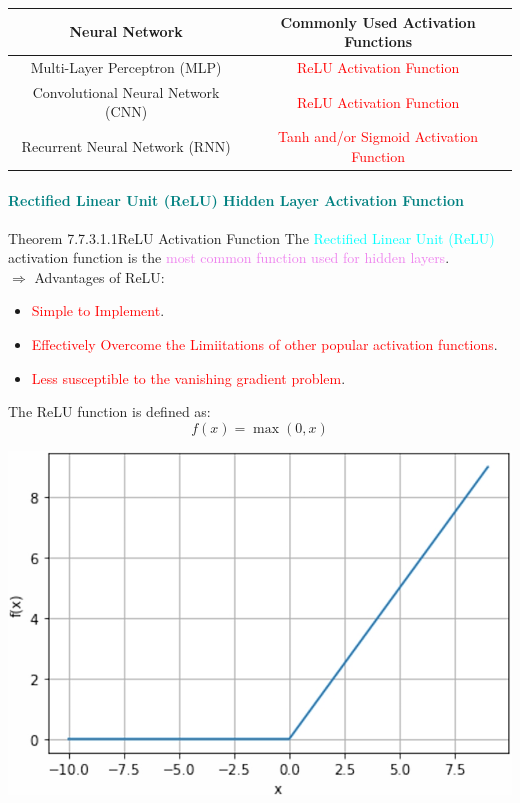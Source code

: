 \documentclass{book}
\begin{document}
\begin{center}
    \begin{tabular}{|c|c|}
        \hline
        \rowcolor{lightblue}
        \textbf{Neural Network} & \textbf{Commonly Used Activation Functions} \\
        \hline
        Multi-Layer Perceptron (MLP) & \textcolor{red}{ReLU Activation Function} \\
        \hline
        Convolutional Neural Network (CNN) & \textcolor{red}{ReLU Activation Function} \\
        \hline
        Recurrent Neural Network (RNN) & \textcolor{red}{Tanh and/or Sigmoid Activation Function} \\
        \hline
    \end{tabular}
\end{center}
\newpage
\textcolor{teal}{\paragraph{Rectified Linear Unit (ReLU) Hidden Layer Activation Function}}
\begin{thmBox}{Theorem 7.7.3.1.1}{ReLU Activation Function}
    The \textcolor{cyan}{Rectified Linear Unit (ReLU)} activation function is the \textcolor{violet}{most common function used for hidden layers}.\\
    $\Rightarrow$ Advantages of ReLU:
    \begin{itemize}
        \item \textcolor{red}{Simple to Implement}.
        \item \textcolor{red}{Effectively Overcome the Limiitations of other popular activation functions}.
        \item \textcolor{red}{Less susceptible to the vanishing gradient problem}.
    \end{itemize}
    The ReLU function is defined as:
    \[
        f(x) = \max(0, x)
    \]
    \begin{center}
        \includegraphics[scale=0.2]{chapter 7/ch7_figure32.jpeg}
    \end{center}
\end{thmBox}
\end{document}
